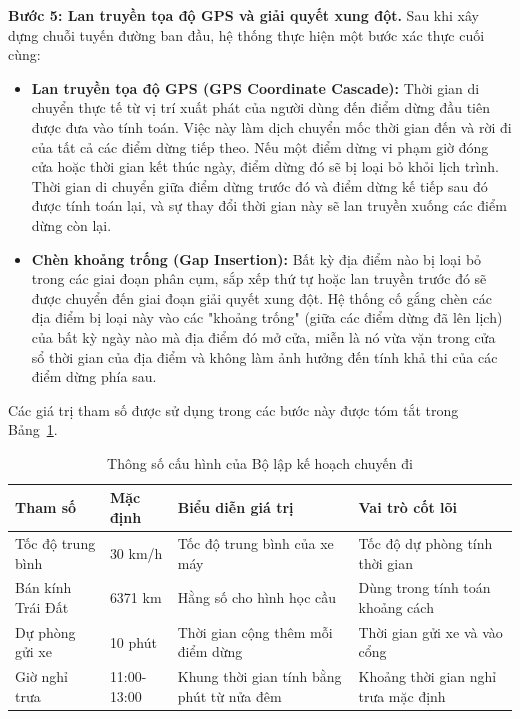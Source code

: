 \documentclass[a4paper,12pt]{report}
\begin{document}
\textbf{Bước 5: Lan truyền tọa độ GPS và giải quyết xung đột.}
Sau khi xây dựng chuỗi tuyến đường ban đầu, hệ thống thực hiện một bước xác thực cuối cùng:
\begin{itemize}
    \item \textbf{Lan truyền tọa độ GPS (GPS Coordinate Cascade):} Thời gian di chuyển thực tế từ vị trí xuất phát của người dùng đến điểm dừng đầu tiên được đưa vào tính toán. Việc này làm dịch chuyển mốc thời gian đến và rời đi của tất cả các điểm dừng tiếp theo. Nếu một điểm dừng vi phạm giờ đóng cửa hoặc thời gian kết thúc ngày, điểm dừng đó sẽ bị loại bỏ khỏi lịch trình. Thời gian di chuyển giữa điểm dừng trước đó và điểm dừng kế tiếp sau đó được tính toán lại, và sự thay đổi thời gian này sẽ lan truyền xuống các điểm dừng còn lại.
    \item \textbf{Chèn khoảng trống (Gap Insertion):} Bất kỳ địa điểm nào bị loại bỏ trong các giai đoạn phân cụm, sắp xếp thứ tự hoặc lan truyền trước đó sẽ được chuyển đến giai đoạn giải quyết xung đột. Hệ thống cố gắng chèn các địa điểm bị loại này vào các "khoảng trống" (giữa các điểm dừng đã lên lịch) của bất kỳ ngày nào mà địa điểm đó mở cửa, miễn là nó vừa vặn trong cửa sổ thời gian của địa điểm và không làm ảnh hưởng đến tính khả thi của các điểm dừng phía sau.
\end{itemize}
Các giá trị tham số được sử dụng trong các bước này được tóm tắt trong Bảng~\ref{tab:trip_parameters}.

\begin{table}[h!]
\centering
\caption{Thông số cấu hình của Bộ lập kế hoạch chuyến đi}
\label{tab:trip_parameters}
\renewcommand{\arraystretch}{1.3}
\begin{tabular}{|p{3cm}|p{2.5cm}|p{5cm}|p{4cm}|}
\hline
\textbf{Tham số} & \textbf{Mặc định} & \textbf{Biểu diễn giá trị} & \textbf{Vai trò cốt lõi} \\ \hline
Tốc độ trung bình & 30 km/h & Tốc độ trung bình của xe máy & Tốc độ dự phòng tính thời gian \\ \hline
Bán kính Trái Đất & 6371 km & Hằng số cho hình học cầu & Dùng trong tính toán khoảng cách \\ \hline
Dự phòng gửi xe & 10 phút & Thời gian cộng thêm mỗi điểm dừng & Thời gian gửi xe và vào cổng \\ \hline
Giờ nghỉ trưa & 11:00-13:00 & Khung thời gian tính bằng phút từ nửa đêm & Khoảng thời gian nghỉ trưa mặc định \\ \hline
\end{tabular}
\end{table}
\end{document}
